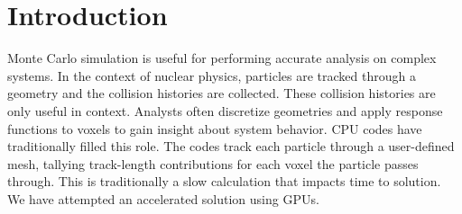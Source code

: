 
\section{Introduction}
    Monte Carlo simulation is useful for performing accurate analysis on complex
systems. In the context of nuclear physics, particles are tracked through a
geometry and the collision histories are collected. These collision histories
are only useful in context. Analysts often discretize geometries and apply response functions to voxels to gain insight about system behavior. CPU codes have traditionally
filled this role. The codes track each particle through a user-defined mesh,
tallying track-length contributions for each voxel the particle passes through.
This is traditionally a slow calculation that impacts time to solution. We have
attempted an accelerated solution using GPUs.

